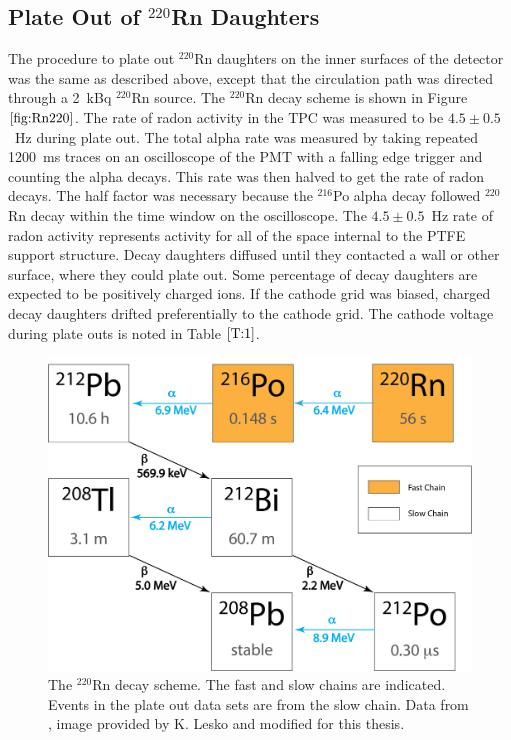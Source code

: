 \subsection{Plate Out of $^{220}$Rn Daughters}
\label{plateout}
The procedure to plate out $^{220}$Rn daughters on the inner surfaces of the detector was the same as described above, except that the circulation path was directed through a 2~kBq $^{220}$Rn source. The $^{220}$Rn decay scheme is shown in Figure~$\ref{fig:Rn220}$. The rate of radon activity in the \ac{TPC} was measured to be $4.5\pm0.5$~Hz during plate out. The total alpha rate was measured by taking repeated 1200~ms traces on an oscilloscope of the PMT with a falling edge trigger and counting the alpha decays. This rate was then halved to get the rate of radon decays. The half factor was necessary because the $^{216}$Po alpha decay followed $^{220}$Rn decay within the time window on the oscilloscope. The $4.5\pm0.5$~Hz rate of radon activity represents activity for all of the space internal to the \ac{PTFE} support structure. Decay daughters diffused until they contacted a wall or other surface, where they could plate out. Some percentage of decay daughters are expected to be positively charged ions. If the cathode grid was biased, charged decay daughters drifted preferentially to the cathode grid. The cathode voltage during plate outs is noted in Table $\ref{T:1}$.

\begin{figure}[ht]
    \centering
     \includegraphics[width=\textwidth]{figures/radon/220Rn_simple_poster.png}
    \caption{The $^{220}$Rn decay scheme. The fast and slow chains are indicated. Events in the plate out data sets are from the slow chain. Data from \cite{LNHB}, image provided by K. Lesko and modified for this thesis.}
    \label{fig:Rn220}
\end{figure}

